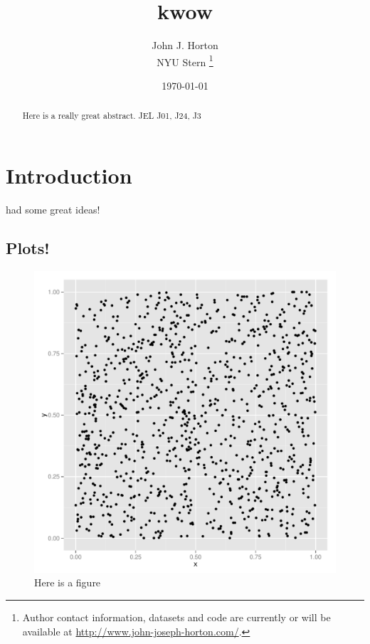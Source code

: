 \documentclass[11pt]{article}
\begin{document}
 

\title{ kwow }

\date{\today}

\author{ John J. Horton \\ NYU Stern \footnote{ Author contact information, datasets and code are currently or will be available at \href{http://www.john-joseph-horton.com/}{http://www.john-joseph-horton.com/}. } }
\maketitle

\begin{abstract}
\noindent  Here is a really great abstract.  \newline
\noindent JEL J01, J24, J3
\end{abstract} 

\section{Introduction}
\cite{smith1999wealth} had some great ideas! 

\subsection{Plots!}

\begin{figure}[h]
  \begin{center}
  \caption{Here is a figure} \label{fig:hist}
  \includegraphics[scale=0.25]{plots/hist.pdf}
  \end{center} 
\end{figure}



\end{document}
